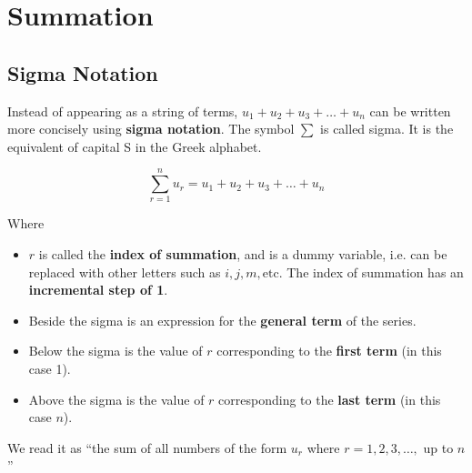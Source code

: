 \documentclass[11pt,a4paper]{book}
\begin{document}
\begin{example}
\begin{enumerate}[label=(\alph*)]
\end{enumerate}

\end{example}

\newpage

\chapter{Summation}

\section{Sigma Notation}

Instead of appearing as a string of terms, $u_{1}+u_{2}+u_{3}+\ldots+u_{n}$ can be written more concisely using \textbf{sigma notation}.
 The symbol $\sum$ is called sigma. It is the equivalent of capital
S in the Greek alphabet.

\begin{tcolorbox}[colback=blue!5, colframe=black,boxrule=.4pt, sharpish corners]

\[
\sum_{r=1}^{n}u_{r}=u_{1}+u_{2}+u_{3}+\ldots+u_{n}
\]

Where 

\begin{itemize}

\item  $r$ is called the \textbf{index of summation}, and is a dummy
variable, i.e. can be replaced with other letters such as $i,j,m,\text{etc.}$
The index of summation has an \textbf{incremental step of 1}.

\item  Beside the sigma is an expression for the \textbf{general
term} of the series.

\item  Below the sigma is the value of $r$ corresponding to the
\textbf{first term} (in this case 1).

\item  Above the sigma is the value of $r$ corresponding to the
\textbf{last term }(in this case $n$).

\end{itemize}

We read it as ``the sum of all numbers of the form $u_{r}$ where
$r=1,2,3,\ldots,$ up to $n$''
\end{tcolorbox}
\end{document}
